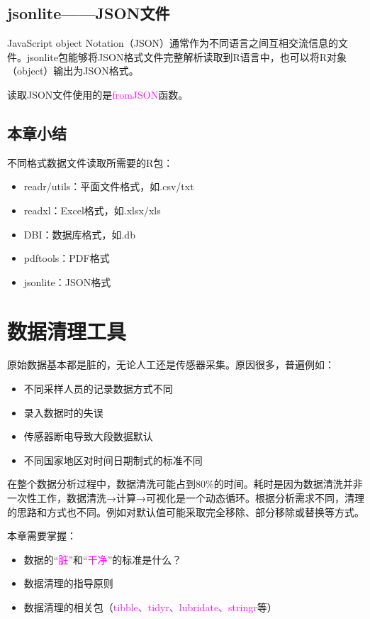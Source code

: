 \documentclass[cn,hazy,blue,14pt,screen]{elegantnote}
\begin{document}
\subsection{jsonlite——JSON文件}

JavaScript object Notation（JSON）通常作为不同语言之间互相交流信息的文件。jsonlite包能够将JSON格式文件完整解析读取到R语言中，也可以将R对象（object）输出为JSON格式。

读取JSON文件使用的是\textcolor{magenta}{fromJSON}函数。

\subsection{本章小结}

不同格式数据文件读取所需要的R包：

\begin{itemize}
  \item readr/utils：平面文件格式，如.csv/txt
  \item readxl：Excel格式，如.xlsx/xls
  \item DBI：数据库格式，如.db
  \item pdftools：PDF格式
  \item jsonlite：JSON格式
\end{itemize}


\newpage
\section{数据清理工具}

原始数据基本都是脏的，无论人工还是传感器采集。原因很多，普遍例如：

\begin{itemize}
  \item 不同采样人员的记录数据方式不同
  \item 录入数据时的失误
  \item 传感器断电导致大段数据默认
  \item 不同国家地区对时间日期制式的标准不同
\end{itemize}

在整个数据分析过程中，数据清洗可能占到80\%的时间。耗时是因为数据清洗并非一次性工作，数据清洗→计算→可视化是一个动态循环。根据分析需求不同，清理的思路和方式也不同。例如对默认值可能采取完全移除、部分移除或替换等方式。

本章需要掌握：

\begin{itemize}
  \item 数据的“\textcolor{magenta}{脏}”和“\textcolor{magenta}{干净}”的标准是什么？
  \item 数据清理的指导原则
  \item 数据清理的相关包（\textcolor{magenta}{tibble、tidyr、lubridate、stringr}等）
\end{itemize}
\end{document}
